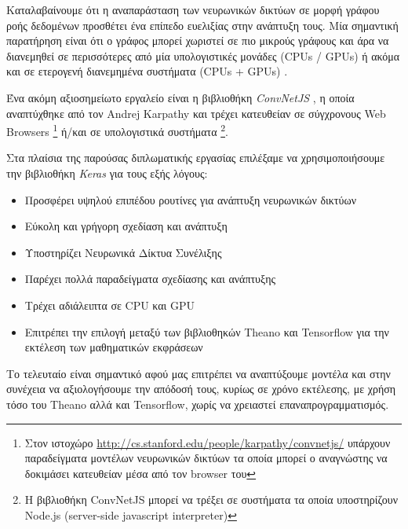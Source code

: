 Καταλαβαίνουμε ότι η αναπαράσταση των νευρωνικών δικτύων σε μορφή γράφου ροής
δεδομένων προσθέτει ένα επίπεδο ευελιξίας στην ανάπτυξη τους. Μία σημαντική παρατήρηση
είναι ότι ο γράφος μπορεί χωριστεί σε πιο μικρούς γράφους και άρα να διανεμηθεί
σε περισσότερες από μία υπολογιστικές μονάδες (CPUs / GPUs) ή ακόμα και
σε ετερογενή διανεμημένα συστήματα (CPUs + GPUs) \cite{DBLP:journals/corr/AbadiABBCCCDDDG16} .

Ένα ακόμη αξιοσημείωτο εργαλείο είναι η βιβλιοθήκη \emph{ConvNetJS} \cite{karpathy2014convnetjs},
η οποία αναπτύχθηκε από τον Andrej Karpathy και τρέχει κατευθείαν σε σύγχρονους
Web Browsers
\footnote{Στον ιστοχώρο \href{http://cs.stanford.edu/people/karpathy/convnetjs/}{http://cs.stanford.edu/people/karpathy/convnetjs/}
υπάρχουν παραδείγματα μοντέλων νευρωνικών δικτύων τα οποία μπορεί ο αναγνώστης να δοκιμάσει
κατευθείαν μέσα από τον browser του}
ή/και σε υπολογιστικά συστήματα
\footnote{Η βιβλιοθήκη ConvNetJS μπορεί να τρέξει σε συστήματα τα οποία
υποστηρίζουν Node.js (server-side javascript interpreter)}.

Στα πλαίσια της παρούσας διπλωματικής εργασίας επιλέξαμε να χρησιμοποιήσουμε
την βιβλιοθήκη \emph{Keras} για τους εξής λόγους:
\begin{itemize}
  \item{Προσφέρει υψηλού επιπέδου ρουτίνες για ανάπτυξη νευρωνικών δικτύων}
  \item{Εύκολη και γρήγορη σχεδίαση και ανάπτυξη}
  \item{Υποστηρίζει Νευρωνικά Δίκτυα Συνέλιξης}
  \item{Παρέχει πολλά παραδείγματα σχεδίασης και ανάπτυξης}
  \item{Τρέχει αδιάλειπτα σε CPU και GPU}
  \item{Επιτρέπει την επιλογή μεταξύ των βιβλιοθηκών Theano και  Tensorflow
    για την εκτέλεση των μαθηματικών εκφράσεων}
\end{itemize}

Το τελευταίο είναι σημαντικό αφού μας επιτρέπει να αναπτύξουμε μοντέλα
και στην συνέχεια να αξιολογήσουμε την απόδοσή τους, κυρίως σε χρόνο εκτέλεσης,
με χρήση τόσο του Theano αλλά και Tensorflow, χωρίς να χρειαστεί
επαναπρογραμματισμός.
